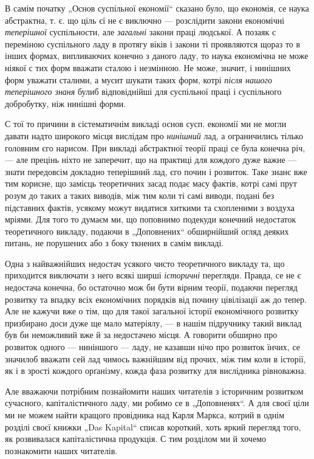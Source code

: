 \noindent{}В самім початку „Основ суспільної економії“ сказано було, що економія, се наука абстрактна, т. є. що ціль єї не є виключно — розслідити закони економічні \emph{теперішної} суспільности, але \emph{загальні} закони праці людської. А позаяк с переміною суспільного ладу в протягу віків і закони ті проявляются щораз то в інших формах, випливаючих конечно з даного ладу, то наука економічна не може ніякої с тих форм вважати сталою і незмінною. Не може, значит, і нинішних форм уважати сталими, а мусит шукати таких форм, котрі \emph{після нашого теперішного знаня} булиб відповіднійші для суспільної праці і суспільного добробутку, ніж нинішні форми.

С тої то причини в сістематичнім викладі основ сусп. економії ми не могли давати надто широкого місця вислідам про \emph{нинішний} лад, а ограничились тілько головним єго нарисом. При викладі абстрактної теорії праці се була конечна річ, — але прецінь ніхто не заперечит, що на практиці для кождого дуже важне — знати передовсім докладно теперішний лад, єго почин і розвиток. Таке знанє вже тим корисне, що замісць теоретичних засад подає масу фактів, котрі самі прут розум до таких а таких виводів, між тим коли ті самі виводи, подані без підставних фактів, усякому можут видатися хиткими та схопленими з воздуха мріями. Для того то думаєм ми, що поповнимо подекуди конечний недостаток теоретичного викладу, подаючи в „Доповнених“ обширнійший огляд деяких питань, не порушених або з боку ткнених в самім викладі.

Одна з найважнійших недостач усякого чисто теоретичного викладу та, що приходится виключати з него всякі ширші \emph{історичні} перегляди. Правда, се не є недостача конечна, бо остаточно мож би бути вірним теорії, подаючи перегляд розвитку та впадку всіх економічних порядків від почину цівілізації аж до тепер. Але не кажучи вже о тім, що для такої загальної історії економічного розвитку призбирано доси дуже ще мало матеріялу, — в нашім підручнику такий виклад був би неможливий вже й за недостачею місця. А говорити обширно про розвиток одного — ниніншого — ладу, не казавши нічо про розвиток їнчих, се значилоб вважати сей лад чимось важнійшим від прочих, між тим коли в історії, як і в зрості кождого орґанізму, кожда фаза розвитку для вислідника рівноважна.

Але вважаючи потрібним познайомити наших читателів з історичним розвитком сучасного, капіталістичного ладу, ми робимо се в „Доповненях“. А для своєї ціли ми не можем найти кращого провідника над Карля Маркса, котрий в однім розділі своєї книжки „Das Kapital“ списав короткий, хоть яркий перегляд того, як розвивалася капіталістична продукція. С тим розділом ми й хочемо познакомити наших читателів.



